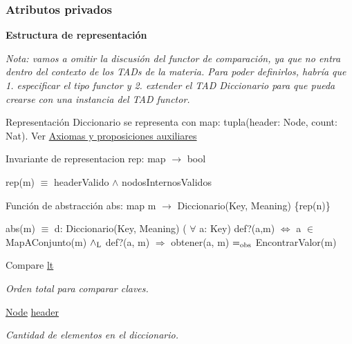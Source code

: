 \subsubsection*{\-Atributos privados}
\begin{Indent}{\bf \-Estructura de representación}\par
{\em \-Nota\-: vamos a omitir la discusión del functor de comparación, ya que no entra dentro del contexto de los \-T\-A\-Ds de la materia. \-Para poder definirlos, habría que 1. especificar el tipo functor y 2. extender el \-T\-A\-D \-Diccionario para que pueda crearse con una instancia del \-T\-A\-D functor.

\begin{DoxyParagraph}{\-Representación}
\-Diccionario se representa con map\-: tupla(header\-: Node, count\-: Nat). \-Ver \hyperlink{axiomas}{\-Axiomas y proposiciones auxiliares}
\end{DoxyParagraph}
\begin{DoxyParagraph}{\-Invariante de representacion}
rep\-: map $\to$ bool\par
 rep(m) $\equiv$ header\-Valido $\land$ nodos\-Internos\-Validos 
\end{DoxyParagraph}
\begin{DoxyParagraph}{\-Función de abstracción}
abs\-: map m $\to$ \-Diccionario(\-Key, \-Meaning) \{rep(n)\}\par
 abs(m) $\equiv$ d\-: \-Diccionario(\-Key, \-Meaning)  ( $\forall$ a\-: \-Key) def?(a,m) $\Leftrightarrow$ a $\in$ \-Map\-A\-Conjunto(m) $\land_{\rm L}$ def?(a, m) $\Rightarrow$ obtener(a, m) $=_{\rm obs}$ \-Encontrar\-Valor(m)  
\end{DoxyParagraph}
}\begin{DoxyCompactItemize}
\item 
\-Compare \hyperlink{classaed2_1_1map_a0e5be36fae0693e4665bd2a615e7550a_a0e5be36fae0693e4665bd2a615e7550a}{lt}
\begin{DoxyCompactList}\small\item\em \-Orden total para comparar claves. \end{DoxyCompactList}\item 
\hyperlink{structaed2_1_1map_1_1Node}{\-Node} \hyperlink{classaed2_1_1map_a92d93f905c8ad73fba18fdc7e8915cce_a92d93f905c8ad73fba18fdc7e8915cce}{header}
\begin{DoxyCompactList}\small\item\em \-Cantidad de elementos en el diccionario. \end{DoxyCompactList}\end{DoxyCompactItemize}
\end{Indent}
